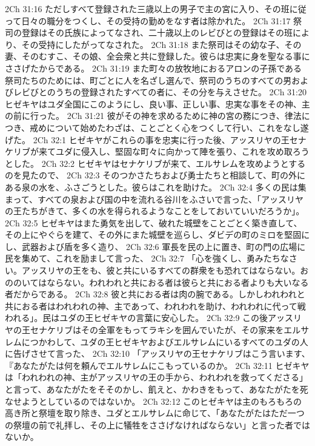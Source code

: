 2Ch 31:16  ただしすべて登録された三歳以上の男子で主の宮に入り、その班に従って日々の職分をつくし、その受持の勤めをなす者は除かれた。
2Ch 31:17  祭司の登録はその氏族によってなされ、二十歳以上のレビびとの登録はその班により、その受持にしたがってなされた。
2Ch 31:18  また祭司はその幼な子、その妻、そのむすこ、その娘、全会衆と共に登録した。彼らは忠実に身を聖なる事にささげたからである。
2Ch 31:19  また町々の放牧地におるアロンの子孫である祭司たちのためには、町ごとに人を名ざし選んで、祭司のうちのすべての男およびレビびとのうちの登録されたすべての者に、その分を与えさせた。
2Ch 31:20  ヒゼキヤはユダ全国にこのようにし、良い事、正しい事、忠実な事をその神、主の前に行った。
2Ch 31:21  彼がその神を求めるために神の宮の務につき、律法につき、戒めについて始めたわざは、ことごとく心をつくして行い、これをなし遂げた。
2Ch 32:1  ヒゼキヤがこれらの事を忠実に行った後、アッスリヤの王セナケリブが来てユダに侵入し、堅固な町々に向かって陣を張り、これを攻め取ろうとした。
2Ch 32:2  ヒゼキヤはセナケリブが来て、エルサレムを攻めようとするのを見たので、
2Ch 32:3  そのつかさたちおよび勇士たちと相談して、町の外にある泉の水を、ふさごうとした。彼らはこれを助けた。
2Ch 32:4  多くの民は集まって、すべての泉および国の中を流れる谷川をふさいで言った、「アッスリヤの王たちがきて、多くの水を得られるようなことをしておいていいだろうか」。
2Ch 32:5  ヒゼキヤはまた勇気を出して、破れた城壁をことごとく築き直して、その上にやぐらを建て、その外にまた城壁を巡らし、ダビデの町のミロを堅固にし、武器および盾を多く造り、
2Ch 32:6  軍長を民の上に置き、町の門の広場に民を集めて、これを励まして言った、
2Ch 32:7  「心を強くし、勇みたちなさい。アッスリヤの王をも、彼と共にいるすべての群衆をも恐れてはならない。おののいてはならない。われわれと共におる者は彼らと共におる者よりも大いなる者だからである。
2Ch 32:8  彼と共におる者は肉の腕である。しかしわれわれと共におる者はわれわれの神、主であって、われわれを助け、われわれに代って戦われる」。民はユダの王ヒゼキヤの言葉に安心した。
2Ch 32:9  この後アッスリヤの王セナケリブはその全軍をもってラキシを囲んでいたが、その家来をエルサレムにつかわして、ユダの王ヒゼキヤおよびエルサレムにいるすべてのユダの人に告げさせて言った、
2Ch 32:10  「アッスリヤの王セナケリブはこう言います、『あなたがたは何を頼んでエルサレムにこもっているのか。
2Ch 32:11  ヒゼキヤは「われわれの神、主がアッスリヤの王の手から、われわれを救ってくださる」と言って、あなたがたをそそのかし、飢えと、かわきをもって、あなたがたを死なせようとしているのではないか。
2Ch 32:12  このヒゼキヤは主のもろもろの高き所と祭壇を取り除き、ユダとエルサレムに命じて、「あなたがたはただ一つの祭壇の前で礼拝し、その上に犠牲をささげなければならない」と言った者ではないか。

